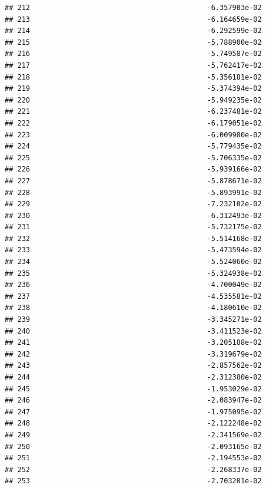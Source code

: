 \documentclass[
]{article}
\begin{document}
\begin{verbatim}
## 212                                          -6.357903e-02
## 213                                          -6.164659e-02
## 214                                          -6.292599e-02
## 215                                          -5.788900e-02
## 216                                          -5.749587e-02
## 217                                          -5.762417e-02
## 218                                          -5.356181e-02
## 219                                          -5.374394e-02
## 220                                          -5.949235e-02
## 221                                          -6.237481e-02
## 222                                          -6.179051e-02
## 223                                          -6.009980e-02
## 224                                          -5.779435e-02
## 225                                          -5.706335e-02
## 226                                          -5.939166e-02
## 227                                          -5.878671e-02
## 228                                          -5.893991e-02
## 229                                          -7.232102e-02
## 230                                          -6.312493e-02
## 231                                          -5.732175e-02
## 232                                          -5.514168e-02
## 233                                          -5.473594e-02
## 234                                          -5.524060e-02
## 235                                          -5.324938e-02
## 236                                          -4.700049e-02
## 237                                          -4.535581e-02
## 238                                          -4.180610e-02
## 239                                          -3.345271e-02
## 240                                          -3.411523e-02
## 241                                          -3.205188e-02
## 242                                          -3.319679e-02
## 243                                          -2.857562e-02
## 244                                          -2.312380e-02
## 245                                          -1.953029e-02
## 246                                          -2.083947e-02
## 247                                          -1.975095e-02
## 248                                          -2.122248e-02
## 249                                          -2.341569e-02
## 250                                          -2.093165e-02
## 251                                          -2.194553e-02
## 252                                          -2.268337e-02
## 253                                          -2.703201e-02

\end{verbatim}
\end{document}
